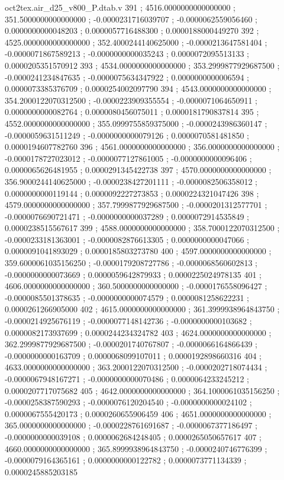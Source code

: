 \begin{filecontents}[overwrite]{oct2tex.air_d25_v800_P.dtab.v}
391 ; 4516.0000000000000000 ; 351.5000000000000000 ; -0.0000231716039707 ; -0.0000062559056460 ; 0.0000000000048203 ; 0.0000057716488300 ; 0.0000188000449270
392 ; 4525.0000000000000000 ; 352.4000244140625000 ; -0.0000213647581404 ; -0.0000071867589213 ; -0.0000000000035243 ; 0.0000072095513133 ; 0.0000205351570912
393 ; 4534.0000000000000000 ; 353.2999877929687500 ; -0.0000241234847635 ; -0.0000075634347922 ; 0.0000000000006594 ; 0.0000073385376709 ; 0.0000254002097790
394 ; 4543.0000000000000000 ; 354.2000122070312500 ; -0.0000223909355554 ; -0.0000071064650911 ; 0.0000000000082764 ; 0.0000080456075011 ; 0.0000181790837814
395 ; 4552.0000000000000000 ; 355.0999755859375000 ; -0.0000243986360147 ; -0.0000059631511249 ; -0.0000000000079126 ; 0.0000070581481850 ; 0.0000194607782760
396 ; 4561.0000000000000000 ; 356.0000000000000000 ; -0.0000178727023012 ; -0.0000077127861005 ; -0.0000000000096406 ; 0.0000065626481955 ; 0.0000291345422738
397 ; 4570.0000000000000000 ; 356.9000244140625000 ; -0.0000238427201111 ; -0.0000082506358012 ; 0.0000000000119144 ; 0.0000092227273853 ; 0.0000224321047426
398 ; 4579.0000000000000000 ; 357.7999877929687500 ; -0.0000201312577701 ; -0.0000076690721471 ; -0.0000000000037289 ; 0.0000072914535849 ; 0.0000238515567617
399 ; 4588.0000000000000000 ; 358.7000122070312500 ; -0.0000233181363001 ; -0.0000082876613305 ; 0.0000000000047066 ; 0.0000091041893029 ; 0.0000185803273780
400 ; 4597.0000000000000000 ; 359.6000061035156250 ; -0.0000179208727786 ; -0.0000068560602813 ; -0.0000000000073669 ; 0.0000059642879933 ; 0.0000225024978135
401 ; 4606.0000000000000000 ; 360.5000000000000000 ; -0.0000176558096427 ; -0.0000085501378635 ; -0.0000000000074579 ; 0.0000081258622231 ; 0.0000261266905000
402 ; 4615.0000000000000000 ; 361.3999938964843750 ; -0.0000214925676119 ; -0.0000077148142736 ; -0.0000000000103682 ; 0.0000082173937699 ; 0.0000244234324782
403 ; 4624.0000000000000000 ; 362.2999877929687500 ; -0.0000201740767807 ; -0.0000066164866439 ; -0.0000000000163709 ; 0.0000068099107011 ; 0.0000192898660316
404 ; 4633.0000000000000000 ; 363.2000122070312500 ; -0.0000202718074434 ; -0.0000067948167271 ; -0.0000000000070486 ; 0.0000064233245212 ; 0.0000207717075682
405 ; 4642.0000000000000000 ; 364.1000061035156250 ; -0.0000258387590293 ; -0.0000076120204540 ; -0.0000000000024102 ; 0.0000067555420173 ; 0.0000260655906459
406 ; 4651.0000000000000000 ; 365.0000000000000000 ; -0.0000228761691687 ; -0.0000067377186497 ; -0.0000000000039108 ; 0.0000062684248405 ; 0.0000265050657617
407 ; 4660.0000000000000000 ; 365.8999938964843750 ; -0.0000240746776399 ; -0.0000079164365161 ; 0.0000000000122782 ; 0.0000073771134339 ; 0.0000245885203185

\end{filecontents}
